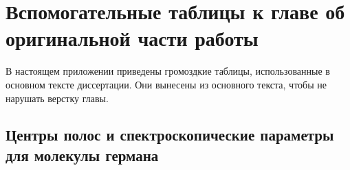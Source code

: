 \chapter{Вспомогательные таблицы к главе об оригинальной части работы}\label{app:ch2_tables}\label{app:si_tables}

В настоящем приложении приведены громоздкие таблицы, использованные в основном тексте диссертации. Они вынесены
из основного текста, чтобы не нарушать верстку главы.

\makeatletter
\newcommand{\apptablecaption}[2]{%
  \par\refstepcounter{table}\label{#1}%
  \begin{center}\small\tablename~\thetable{} --- #2\end{center}%
  \vspace{0.4ex}%
}
\makeatother



% 

% 

% 

% 

\section{Центры полос и спектроскопические параметры для молекулы германа}\label{app:ge_fit_tables}







